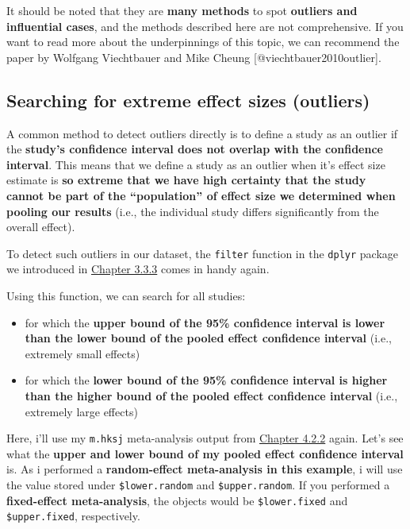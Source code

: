 \documentclass[]{book}
\providecommand{\tightlist}{%
  \setlength{\itemsep}{0pt}\setlength{\parskip}{0pt}}
\theoremstyle{definition}
\theoremstyle{definition}
\theoremstyle{definition}
\theoremstyle{remark}
\begin{document}
\begin{rmdachtung}
It should be noted that they are \textbf{many methods} to spot
\textbf{outliers and influential cases}, and the methods described here
are not comprehensive. If you want to read more about the underpinnings
of this topic, we can recommend the paper by Wolfgang Viechtbauer and
Mike Cheung {[}@viechtbauer2010outlier{]}.
\end{rmdachtung}

\hypertarget{outliers}{\subsection{Searching for extreme effect sizes
(outliers)}\label{outliers}}

A common method to detect outliers directly is to define a study as an
outlier if the \textbf{study's confidence interval does not overlap with
the confidence interval}. This means that we define a study as an
outlier when it's effect size estimate is \textbf{so extreme that we
have high certainty that the study cannot be part of the ``population''
of effect size we determined when pooling our results} (i.e., the
individual study differs significantly from the overall effect).

To detect such outliers in our dataset, the \texttt{filter} function in
the \texttt{dplyr} package we introduced in
\protect\hyperlink{filter}{Chapter 3.3.3} comes in handy again.

Using this function, we can search for all studies:

\begin{itemize}
\tightlist
\item
  for which the \textbf{upper bound of the 95\% confidence interval is
  lower than the lower bound of the pooled effect confidence interval}
  (i.e., extremely small effects)
\item
  for which the \textbf{lower bound of the 95\% confidence interval is
  higher than the higher bound of the pooled effect confidence interval}
  (i.e., extremely large effects)
\end{itemize}

Here, i'll use my \texttt{m.hksj} meta-analysis output from
\protect\hyperlink{random.precalc}{Chapter 4.2.2} again. Let's see what
the \textbf{upper and lower bound of my pooled effect confidence
interval} is. As i performed a \textbf{random-effect meta-analysis in
this example}, i will use the value stored under \texttt{\$lower.random}
and \texttt{\$upper.random}. If you performed a \textbf{fixed-effect
meta-analysis}, the objects would be \texttt{\$lower.fixed} and
\texttt{\$upper.fixed}, respectively.
\end{document}

